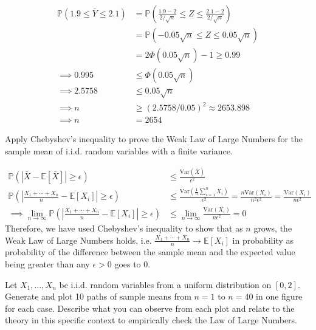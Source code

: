 \documentclass{article}
\newcommand{\E}{\mathbb{E}}
\newcommand{\V}{\text{Var}}
\renewcommand{\P}{\mathbb{P}}
\begin{document}
\begin{probset}
\begin{prob}[\textbf{4.3.34}]
    \begin{soln}
        \begin{align*}
            \P(1.9 \leq \bar Y \leq 2.1) &= \P\left( \frac{1.9 - 2}{2/\sqrt{n}} \leq Z \leq \frac{2.1 - 2}{2/\sqrt{n}} \right) \\
            &= \P(-0.05\sqrt{n} \leq Z \leq 0.05\sqrt{n}) \\
            &= 2\Phi(0.05\sqrt{n}) - 1 \geq 0.99 \\
            \implies 0.995 &\leq \Phi(0.05\sqrt{n}) \\
            \implies 2.5758 &\leq 0.05\sqrt{n} \\
            \implies n &\geq (2.5758/0.05)^2 \approx 2653.898 \\
            \implies n &= 2654
        \end{align*}
    \end{soln}
\end{prob}

\begin{prob}
    Apply Chebyshev's inequality to prove the Weak Law of Large Numbers for the sample mean of i.i.d. random variables with a finite variance.

    \begin{soln}
        \begin{align*}  
            \P(|\bar X - \E[\bar X]| \geq \epsilon) &\leq \frac{\V(\bar X)}{\epsilon^2} \\
            \P\left( \left| \frac{X_1 + \cdots + X_n}{n} - \E[X_i] \right| \geq \epsilon \right) &\leq \frac{\V(\frac1n \sum_{i=1}^n X_i)}{\epsilon^2} = \frac{n\V(X_i)}{n^2\epsilon^2} = \frac{\V(X_i)}{n\epsilon^2} \\
            \implies \lim_{n \rightarrow \infty} \P\left( \left| \frac{X_1 + \cdots + X_n}{n} - \E[X_i] \right| \geq \epsilon \right) &\leq \lim_{n \rightarrow \infty} \frac{\V(X_i)}{n\epsilon^2} = 0
        \end{align*}
        Therefore, we have used Chebyshev's inequality to show that as $n$ grows, the Weak Law of Large Numbers holds, i.e. $\frac{X_1 + \cdots + X_n}{n} \rightarrow \E[X_i]$ in probability as probability of the difference between the sample mean and the expected value being greater than any $\epsilon > 0$ goes to 0.
    \end{soln}
\end{prob}

\newpage

\begin{prob}
    Let $X_1, \ldots, X_n$ be i.i.d. random variables from a uniform distribution on $[0, 2]$. Generate and plot 10 paths of sample means from $n = 1$ to $n = 40$ in one figure for each case. Describe what you can observe from each plot and relate to the theory in this specific context to empirically check the Law of Large Numbers.


\end{prob}
\end{probset}
\end{document}
